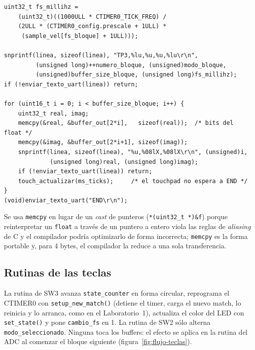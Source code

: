 \documentclass[11pt,a4paper]{article}
\begin{document}
\begin{lstlisting}[caption={Armado y envío de la trama en \texttt{enviar\_buffer()} (\texttt{source/TP3.c}).},label={lst:tx}]
uint32_t fs_millihz =
    (uint32_t)((1000ULL * CTIMER0_TICK_FREQ) /
    (2ULL * (CTIMER0_config.prescale + 1ULL) *
     (sample_vel[fs_bloque] + 1ULL)));

snprintf(linea, sizeof(linea), "TP3,%lu,%u,%u,%lu\r\n",
         (unsigned long)++numero_bloque, (unsigned)modo_bloque,
         (unsigned)buffer_size_bloque, (unsigned long)fs_millihz);
if (!enviar_texto_uart(linea)) return;

for (uint16_t i = 0; i < buffer_size_bloque; i++) {
    uint32_t real, imag;
    memcpy(&real, &buffer_out[2*i],   sizeof(real));  /* bits del float */
    memcpy(&imag, &buffer_out[2*i+1], sizeof(imag));
    snprintf(linea, sizeof(linea), "%u,%08lX,%08lX\r\n", (unsigned)i,
             (unsigned long)real, (unsigned long)imag);
    if (!enviar_texto_uart(linea)) return;
    touch_actualizar(ms_ticks);     /* el touchpad no espera a END */
}
(void)enviar_texto_uart("END\r\n");
\end{lstlisting}

Se usa \texttt{memcpy} en lugar de un \emph{cast} de punteros
(\texttt{*(uint32\_t *)\&f}) porque reinterpretar un \texttt{float} a
través de un puntero a entero viola las reglas de \emph{aliasing} de C y
el compilador podría optimizarlo de forma incorrecta; \texttt{memcpy} es la
forma portable y, para 4 bytes, el compilador la reduce a una sola
transferencia.

\subsection{Rutinas de las teclas}

La rutina de SW3 avanza \texttt{state\_counter} en forma circular,
reprograma el CTIMER0 con \texttt{setup\_new\_match()} (detiene el timer,
carga el nuevo match, lo reinicia y lo arranca, como en el Laboratorio~1),
actualiza el color del LED con \texttt{set\_state()} y pone
\texttt{cambio\_fs} en 1. La rutina de SW2 sólo alterna
\texttt{modo\_seleccionado}. Ninguna toca los buffers: el efecto se aplica
en la rutina del ADC al comenzar el bloque siguiente
(figura~\ref{fig:flujo-teclas}).
\end{document}
